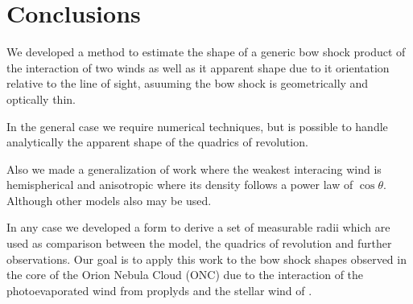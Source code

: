\section{Conclusions}
\label{sec:conc}


We developed a method to estimate the shape of a generic bow shock product of the
interaction of two winds as well as it apparent shape due to it orientation relative to the line of sight, asuuming
the bow shock is geometrically and optically thin.

In the general case we require numerical techniques, but is possible to handle analytically the apparent shape of
the quadrics of revolution. 

Also we made a generalization of \CRW{} work where the weakest interacing wind is hemispherical and anisotropic where its
density follows a power law of $\cos\theta$. Although other models also may be used.

In any case we developed a form to derive a set of measurable radii which are used as comparison between the \CRW{} model, the quadrics
of revolution and further observations. Our goal is to apply this work to the bow shock shapes observed in the core of the Orion Nebula Cloud
(ONC) due to the interaction of the photoevaporated wind from proplyds and the stellar wind of \thC{}.



